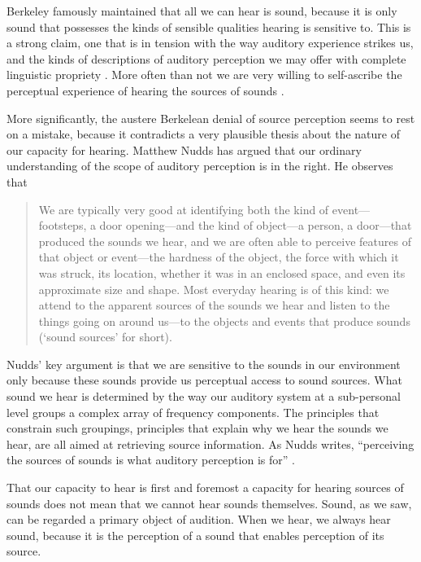 \documentclass[sloppy, journal, git, bytitle, dodraft]{humapap}
\begin{document}
Berkeley famously maintained that all we can hear is sound, because it is only sound that possesses the kinds of sensible qualities hearing is sensitive to. This is a strong claim, one that is in tension with the way auditory experience strikes us, and the kinds of descriptions of auditory perception we may offer with complete linguistic propriety \autocite[p. 117]{urmson1968aa}. More often than not we are very willing to self-ascribe the perceptual experience of hearing the sources of sounds \autocite{broad1965aa}.

More significantly, the austere Berkelean denial of source perception seems to rest on a mistake, because it contradicts a very plausible thesis about the nature of our capacity for hearing. Matthew Nudds has argued that our ordinary understanding of the scope of auditory perception is in the right. He observes that
\begin{quote}
We are typically very good at identifying both the kind of event---footsteps, a door opening---and the kind of object---a person, a door---that produced the sounds we hear, and we are often able to perceive features of that object or event—the hardness of the object, the force with which it was struck, its location, whether it was in an enclosed space, and even its approximate size and shape. Most everyday hearing is of this kind: we attend to the apparent sources of the sounds we hear and listen to the things going on around us---to the objects and events that produce sounds (`sound sources' for short). \autocite[pp. 283-84]{nudds2010aa}
\end{quote}

Nudds' key argument is that we are sensitive to the sounds in our environment only because these sounds provide us perceptual access to sound sources. What sound we hear is determined by the way our auditory system at a sub-personal level groups a complex array of frequency components. The principles that constrain such groupings, principles that explain why we hear the sounds we hear, are all aimed at retrieving source information. As Nudds writes, ``perceiving the sources of sounds is what auditory perception is for'' \autocite[p. 284]{nudds2010aa}.

That our capacity to hear is first and foremost a capacity for hearing sources of sounds does not mean that we cannot hear sounds themselves. Sound, as we saw, can be regarded a primary object of audition. When we hear, we always hear sound, because it is the perception of a sound that enables perception of its source. 
\end{document}
